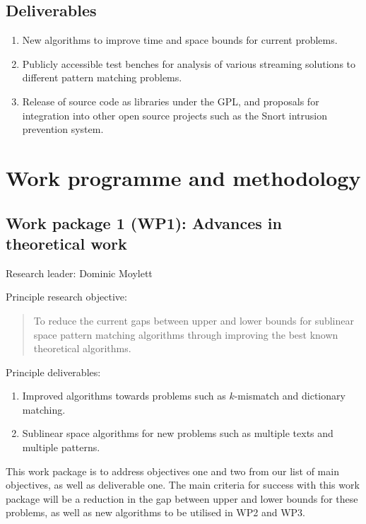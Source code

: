 \documentclass[a4paper,11pt]{article}
\begin{document}
    \subsection{Deliverables}

    \begin{enumerate}
        \item New algorithms to improve time and space bounds for current problems.
        \item Publicly accessible test benches for analysis of various streaming solutions to different pattern matching problems.
        \item Release of source code as libraries under the GPL, and proposals for integration into other open source projects such as the Snort intrusion prevention system.
    \end{enumerate}

    \section{Work programme and methodology}

    \subsection*{Work package 1 (WP1): Advances in theoretical work}

    Research leader: Dominic Moylett

    Principle research objective:
    \begin{quote}
        To reduce the current gaps between upper and lower bounds for sublinear space pattern matching algorithms through improving the best known theoretical algorithms.
    \end{quote}

    Principle deliverables:
    \begin{enumerate}
        \item Improved algorithms towards problems such as $k$-mismatch and dictionary matching.
        \item Sublinear space algorithms for new problems such as multiple texts and multiple patterns.
    \end{enumerate}

    This work package is to address objectives one and two from our list of main objectives, as well as deliverable one. The main criteria for success with this work package will be a reduction in the gap between upper and lower bounds for these problems, as well as new algorithms to be utilised in WP2 and WP3.
\end{document}

